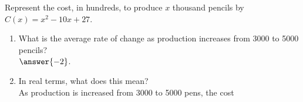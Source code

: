 \documentclass{ximera}
\author{Elizabeth Campolongo}
\begin{document}
\begin{exercise}
Represent the cost, in hundreds, to produce $x$ thousand pencils by $C(x) = x^2-10x+27$. 
\begin{enumerate}
\item What is the average rate of change as production increases from 3000 to 5000 pencils?\\
$\answer{-2}$.

\item In real terms, what does this mean? \\
As production is increased from 3000 to 5000 pens, the cost
\begin{multipleChoice}
\end{multipleChoice}
\end{enumerate}
\end{exercise}
\end{document}
